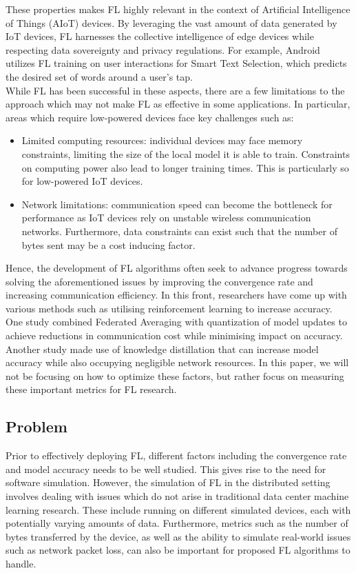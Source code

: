 \documentclass[12pt]{article}
\begin{document}
These properties makes FL highly relevant in the context of Artificial Intelligence of Things
(AIoT) devices. By leveraging the vast amount of data generated by IoT devices, FL harnesses the
collective intelligence of edge devices while respecting data sovereignty and privacy
regulations. For example, Android utilizes FL training on user interactions for Smart Text Selection,
which predicts the desired set of words around a user's tap\cite{android}.\\

While FL has been successful in these aspects, there are a few limitations to the approach which may
not make FL as effective in some applications. In particular, areas which require low-powered
devices face key challenges such as:
\begin{itemize}
  \item Limited computing resources: individual devices may face memory constraints, limiting the
    size of the local model it is able to train. Constraints on computing power also lead to
    longer training times. This is particularly so for low-powered IoT devices.
  \item Network limitations: communication speed can become the bottleneck for performance as IoT
    devices rely on unstable wireless communication networks. Furthermore, data constraints can
    exist such that the number of bytes sent may be a cost inducing factor.
\end{itemize}

Hence, the development of FL algorithms often seek to advance progress towards solving the
aforementioned issues by improving the convergence rate and increasing communication efficiency. In
this front, researchers have come up with various methods such as utilising reinforcement learning
to increase accuracy\cite{Wang2020OptimizingFL}. One study combined Federated Averaging with quantization of model
updates to achieve reductions in communication cost while minimising impact on accuracy\cite{konečný2017federated}.
Another study made use of knowledge distillation\cite{hinton2015distilling} that can increase
model accuracy while also occupying negligible network resources\cite{liu2022efficient}. In this
paper, we will not be focusing on how to optimize these factors, but rather focus on measuring these
important metrics for FL research.

\subsection{Problem}
Prior to effectively deploying FL, different factors including the convergence rate and
model accuracy needs to be well studied. This gives rise to the need for software simulation. However, the
simulation of FL in the distributed setting involves dealing with
issues which do not arise in traditional data center machine learning research. These include running on different simulated
devices, each with potentially varying amounts of data. Furthermore, metrics such as the number of
bytes transferred by the device, as well as the ability to simulate real-world issues such as
network packet loss, can also be important for proposed FL algorithms to handle.
\end{document}
